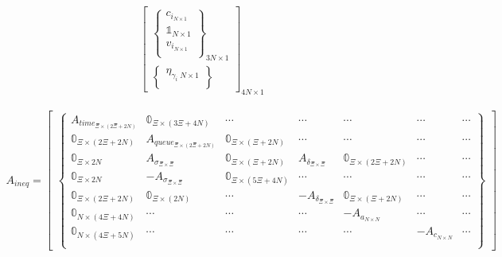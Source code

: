 \documentclass[conference]{IEEEtran}
\begin{document}
\begin{equation}
\begin{array}{c}
\begin{bmatrix}
\begin{Bmatrix}
        c_{i_{N \times 1}} \\
        \mathbb{1}_{N \times 1} \\
        v_{i_{N \times 1}} \\
    \end{Bmatrix}_{3N \times 1} \\
    \begin{Bmatrix}
        \eta_{\gamma_{i}\; N \times 1} \\
    \end{Bmatrix}
\end{bmatrix}_{4N \times 1}
\end{array}
\end{equation}

\begin{equation}
\begin{array}{c}
    A_{ineq} =
    \begin{bmatrix}
        \begin{Bmatrix}
            A_{time_{\Xi \times (2\Xi + 2N)}}   & \mathbb{0}_{\Xi \times (3\Xi + 4N)} & \cdots                              & \cdots                       & \cdots                            & \cdots              & \cdots \\
            \mathbb{0}_{\Xi \times (2\Xi + 2N)} & A_{queue_{\Xi \times (2\Xi + 2N)}}  & \mathbb{0}_{\Xi \times (\Xi + 2N)}  & \cdots                       & \cdots                            & \cdots              & \cdots \\
            \mathbb{0}_{\Xi \times 2N}          & A_{\sigma_{\Xi \times \Xi}}         & \mathbb{0}_{\Xi \times (\Xi + 2N)}  & A_{\delta_{\Xi \times \Xi}}  & \mathbb{0}_{\Xi \times (2\Xi + 2N)} & \cdots              & \cdots \\
            \mathbb{0}_{\Xi \times 2N}          & -A_{\sigma_{\Xi \times \Xi}}        & \mathbb{0}_{\Xi \times (5\Xi + 4N)} & \cdots                       & \cdots                            & \cdots              & \cdots \\
            \mathbb{0}_{\Xi \times (2\Xi + 2N)} & \mathbb{0}_{\Xi \times (2N)}  & \cdots                              & -A_{\delta_{\Xi \times \Xi}} & \mathbb{0}_{\Xi \times (\Xi + 2N)}        & \cdots              & \cdots \\
            \mathbb{0}_{N \times (4\Xi + 4N)}   & \cdots                              & \cdots                              & \cdots                       & -A_{a_{N \times N}}               & \cdots              & \cdots \\
            \mathbb{0}_{N \times (4\Xi + 5N)}   & \cdots                              & \cdots                              & \cdots                       & \cdots                            & -A_{c_{N \times N}} & \cdots \\

\end{Bmatrix}
\end{bmatrix}
\end{array}
\end{equation}
\end{document}
